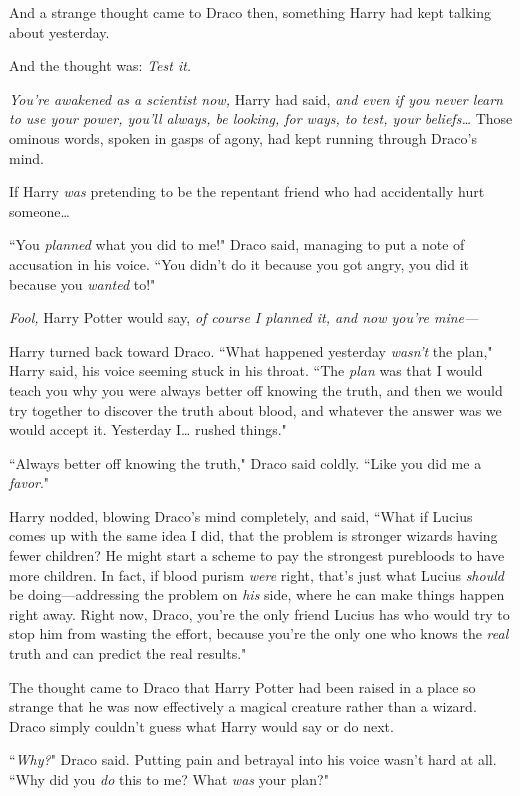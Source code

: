 And a strange thought came to Draco then, something Harry had kept talking about yesterday.

And the thought was: \emph{Test it.}

\emph{You're awakened as a scientist now,} Harry had said, \emph{and even if you never learn to use your power, you'll always, be looking, for ways, to test, your beliefs{\ldots}} Those ominous words, spoken in gasps of agony, had kept running through Draco's mind.

If Harry \emph{was} pretending to be the repentant friend who had accidentally hurt someone{\ldots}

``You \emph{planned} what you did to me!" Draco said, managing to put a note of accusation in his voice. ``You didn't do it because you got angry, you did it because you \emph{wanted} to!"

\emph{Fool,} Harry Potter would say, \emph{of course I planned it, and now you're mine—}

Harry turned back toward Draco. ``What happened yesterday \emph{wasn't} the plan," Harry said, his voice seeming stuck in his throat. ``The \emph{plan} was that I would teach you why you were always better off knowing the truth, and then we would try together to discover the truth about blood, and whatever the answer was we would accept it. Yesterday I{\ldots} rushed things."

``Always better off knowing the truth," Draco said coldly. ``Like you did me a \emph{favor}."

Harry nodded, blowing Draco's mind completely, and said, ``What if Lucius comes up with the same idea I did, that the problem is stronger wizards having fewer children? He might start a scheme to pay the strongest purebloods to have more children. In fact, if blood purism \emph{were} right, that's just what Lucius \emph{should} be doing—addressing the problem on \emph{his} side, where he can make things happen right away. Right now, Draco, you're the only friend Lucius has who would try to stop him from wasting the effort, because you're the only one who knows the \emph{real} truth and can predict the real results."

The thought came to Draco that Harry Potter had been raised in a place so strange that he was now effectively a magical creature rather than a wizard. Draco simply couldn't guess what Harry would say or do next.

``\emph{Why?}" Draco said. Putting pain and betrayal into his voice wasn't hard at all. ``Why did you \emph{do} this to me? What \emph{was} your plan?"

